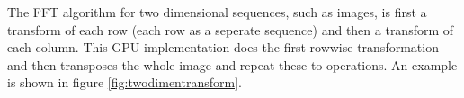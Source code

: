 The FFT algorithm for two dimensional sequences, such as images, is first a transform of each row (each row as a seperate sequence) and then a transform of each column. This GPU implementation does the first rowwise transformation and then transposes the whole image and repeat these to operations. An example is shown in figure \ref{fig:twodimentransform}.

